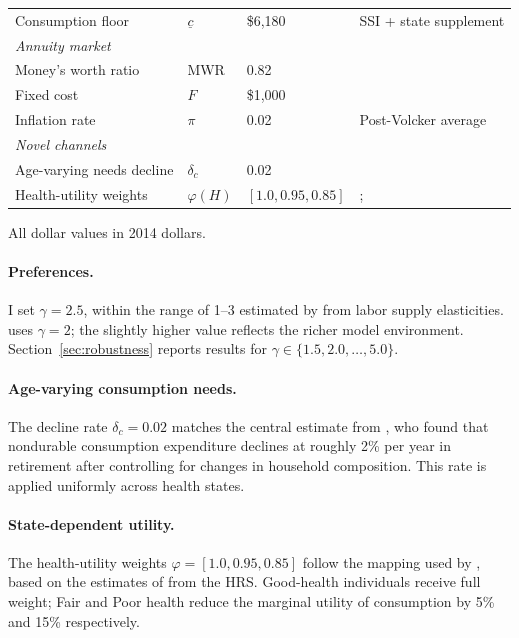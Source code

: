 \documentclass[12pt]{article}
\begin{document}
\begin{table}[htbp]
\begin{threeparttable}
\begin{tabular}{llll}
Consumption floor & $\underline{c}$ & \$6,180 & SSI + state supplement \\[6pt]
\multicolumn{4}{l}{\textit{Annuity market}} \\
Money's worth ratio & MWR & 0.82 & \citet{mitchell1999} \\
Fixed cost & $F$ & \$1,000 & \citet{lockwood2012} \\
Inflation rate & $\pi$ & 0.02 & Post-Volcker average \\[6pt]
\multicolumn{4}{l}{\textit{Novel channels}} \\
Age-varying needs decline & $\delta_c$ & 0.02 & \citet{aguiarhurst2013} \\
Health-utility weights & $\varphi(H)$ & $[1.0, 0.95, 0.85]$ & \citet{finkelsteinluttmer2013}; \citet{reichlingsmetters2015} \\
\bottomrule
\end{tabular}
\begin{tablenotes}
\small
\item All dollar values in 2014 dollars.
\end{tablenotes}
\end{threeparttable}
\end{table}

\paragraph{Preferences.} I set $\gamma = 2.5$, within the range of 1--3 estimated by \citet{chetty2006} from labor supply elasticities. \citet{lockwood2012} uses $\gamma = 2$; the slightly higher value reflects the richer model environment. Section~\ref{sec:robustness} reports results for $\gamma \in \{1.5, 2.0, \ldots, 5.0\}$.

\paragraph{Age-varying consumption needs.} The decline rate $\delta_c = 0.02$ matches the central estimate from \citet{aguiarhurst2013}, who found that nondurable consumption expenditure declines at roughly 2\% per year in retirement after controlling for changes in household composition. This rate is applied uniformly across health states.

\paragraph{State-dependent utility.} The health-utility weights $\varphi = [1.0, 0.95, 0.85]$ follow the mapping used by \citet{reichlingsmetters2015}, based on the estimates of \citet{finkelsteinluttmer2013} from the HRS. Good-health individuals receive full weight; Fair and Poor health reduce the marginal utility of consumption by 5\% and 15\% respectively.
\end{document}

